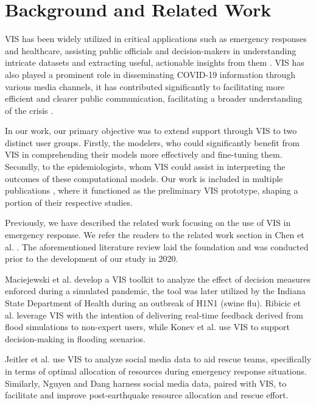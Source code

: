 \section{Background and Related Work}

\ac{VIS} has been widely utilized in critical applications such as emergency responses and healthcare, assisting public officials and decision-makers in understanding intricate datasets and extracting useful, actionable insights from them \cite{dusse2016Information}. 
\ac{VIS} has also played a prominent role in disseminating COVID-19 information through various media channels, it has contributed significantly to facilitating more efficient and clearer public communication, facilitating a broader understanding of the crisis \cite{johnshopkinsuniversityCOVID19}.

In our work, our primary objective was to extend support through \ac{VIS} to two distinct user groups. Firstly, the modelers, who could significantly benefit from VIS in comprehending their models more effectively and fine-tuning them. Secondly, to the epidemiologists, whom VIS could assist in interpreting the outcomes of these computational models. Our work is included in multiple publications \cite{chen2022RAMPVIS,dykes2022Visualizationb,khan2022Propagating,khan2022Rapid,rydow2023RAMPVIS}, where it functioned as the preliminary VIS prototype, shaping a portion of their respective studies.


Previously, we have described the related work focusing on the use of \ac{VIS} in emergency response. We refer the readers to the related work section in Chen et al. \cite{chen2022RAMPVIS}. The aforementioned literature review laid the foundation and was conducted prior to the development of our study in 2020.

Maciejewski et al. \cite{maciejewski2011Pandemica} develop a VIS toolkit to analyze the effect of decision measures enforced during a simulated pandemic, the tool was later utilized by the Indiana State Department of Health during an outbreak of H1N1 (swine flu).
Ribicic et al. \cite{ribicic2012Sketching} leverage VIS with the intention of delivering real-time feedback derived from flood simulations to non-expert users, while Konev et al. \cite{konev2014Run} use VIS to support decision-making in flooding scenarios.

Jeitler et al. \cite{jeitler2019RescueMark} use VIS to analyze social media data to aid rescue teams, specifically in terms of optimal allocation of resources during emergency response situations. Similarly, Nguyen and Dang \cite{nguyen2019EQSA} harness social media data, paired with VIS, to facilitate and improve post-earthquake resource allocation and rescue effort.

